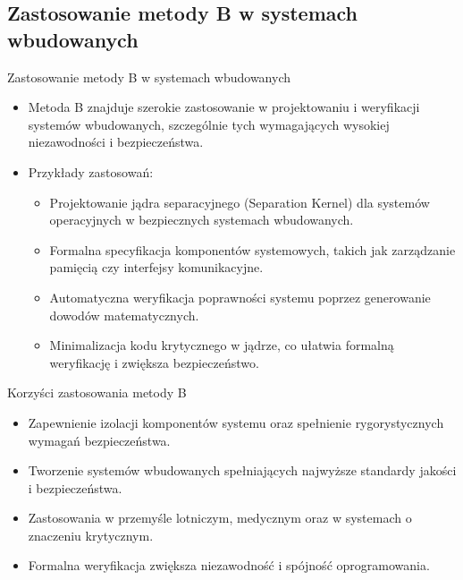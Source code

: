 \documentclass{beamer}
\begin{document}
\subsection{Zastosowanie metody B w systemach wbudowanych}
\begin{frame}{Zastosowanie metody B w systemach wbudowanych}
\begin{itemize}
  \item Metoda B znajduje szerokie zastosowanie w projektowaniu i weryfikacji systemów wbudowanych, szczególnie tych wymagających wysokiej niezawodności i bezpieczeństwa.
  \item Przykłady zastosowań:
  \begin{itemize}
    \item Projektowanie jądra separacyjnego (Separation Kernel) dla systemów operacyjnych w bezpiecznych systemach wbudowanych.
    \item Formalna specyfikacja komponentów systemowych, takich jak zarządzanie pamięcią czy interfejsy komunikacyjne.
    \item Automatyczna weryfikacja poprawności systemu poprzez generowanie dowodów matematycznych.
    \item Minimalizacja kodu krytycznego w jądrze, co ułatwia formalną weryfikację i zwiększa bezpieczeństwo.
  \end{itemize}
\end{itemize}
\end{frame}

\begin{frame}{Korzyści zastosowania metody B}
\begin{itemize}
  \item Zapewnienie izolacji komponentów systemu oraz spełnienie rygorystycznych wymagań bezpieczeństwa.
  \item Tworzenie systemów wbudowanych spełniających najwyższe standardy jakości i bezpieczeństwa.
  \item Zastosowania w przemyśle lotniczym, medycznym oraz w systemach o znaczeniu krytycznym.
  \item Formalna weryfikacja zwiększa niezawodność i spójność oprogramowania.
\end{itemize}
\end{frame}
\end{document}
